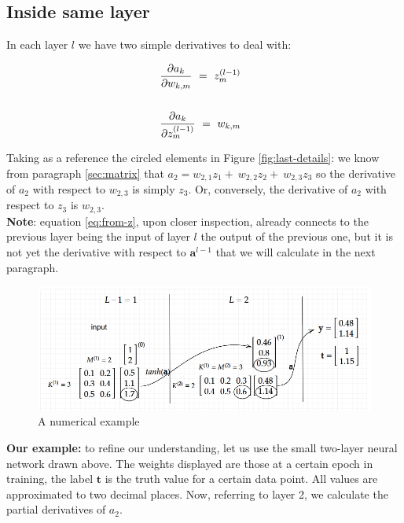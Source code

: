 \documentclass{article}
\begin{document}
\subsection{Inside same layer}\label{sec:same-layer}

In each layer $\displaystyle l$ we have two simple derivatives to deal with:

\begin{gather}
\frac{\partial a_{k}}{\partial w_{k,m}} \ =\ z_{m}^{( l-1)} \label{eq:from-w}\ \ \\
\notag\\
\frac{\partial a_{k}}{\partial z_{m}^{( l-1)}} \ =\ w_{k,m} \label{eq:from-z} \ \
\end{gather}

Taking as a reference the circled elements in Figure \ref{fig:last-details}: we know from paragraph \ref{sec:matrix} that $\displaystyle a_{2} =w_{2,1} z_{1} +\ w_{2,2} z_{2} +\ w_{2,3} z_{3}$ so the derivative of $ a_2$ with respect to $\displaystyle w_{2,3}$ is simply $\displaystyle z_{3}$. Or, conversely, the derivative of $\displaystyle a_{2}$ with respect to $\displaystyle z_{3}$ is  $\displaystyle w_{2,3}$.\\

\textbf{Note}: equation \eqref{eq:from-z}, upon closer inspection, already connects to the previous layer being the input of layer $\displaystyle l$ the output of the previous one, but it is not yet the derivative with respect to $\boldsymbol{a}^{l-1}$ that we will calculate in the next paragraph.\\

\begin{figure}[H]
    \centering
    \includegraphics[width=0.8\linewidth]{images/example.png}
    \caption{A numerical example}
    \label{fig:example}
\end{figure}

\textbf{Our example:} to refine our understanding, let us use the small two-layer neural network drawn above. The weights displayed are those at a certain epoch in training, the label $\boldsymbol{t}$ is the truth value for a certain data point. All values are approximated to two decimal places. Now, referring to layer 2, we calculate the partial derivatives of $a_2$.
\end{document}
